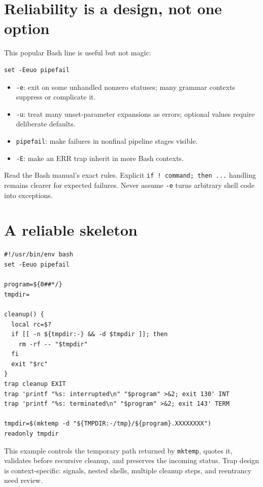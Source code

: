 \documentclass[11pt,oneside,openany]{book}
\begin{document}
\section{Reliability is a design, not one option}
This popular Bash line is useful but not magic:
\begin{lstlisting}
set -Eeuo pipefail
\end{lstlisting}
\begin{itemize}
  \item \texttt{-e}: exit on some unhandled nonzero statuses; many grammar contexts suppress or complicate it.
  \item \texttt{-u}: treat many unset-parameter expansions as errors; optional values require deliberate defaults.
  \item \texttt{pipefail}: make failures in nonfinal pipeline stages visible.
  \item \texttt{-E}: make an ERR trap inherit in more Bash contexts.
\end{itemize}
Read the Bash manual's exact rules. Explicit \texttt{if ! command; then ...} handling remains clearer for expected failures. Never assume \texttt{-e} turns arbitrary shell code into exceptions.

\section{A reliable skeleton}
\begin{lstlisting}
#!/usr/bin/env bash
set -Eeuo pipefail

program=${0##*/}
tmpdir=

cleanup() {
  local rc=$?
  if [[ -n ${tmpdir:-} && -d $tmpdir ]]; then
    rm -rf -- "$tmpdir"
  fi
  exit "$rc"
}
trap cleanup EXIT
trap 'printf "%s: interrupted\n" "$program" >&2; exit 130' INT
trap 'printf "%s: terminated\n" "$program" >&2; exit 143' TERM

tmpdir=$(mktemp -d "${TMPDIR:-/tmp}/${program}.XXXXXXXX")
readonly tmpdir
\end{lstlisting}
This example controls the temporary path returned by \texttt{mktemp}, quotes it, validates before recursive cleanup, and preserves the incoming status. Trap design is context-specific: signals, nested shells, multiple cleanup steps, and reentrancy need review.
\end{document}
